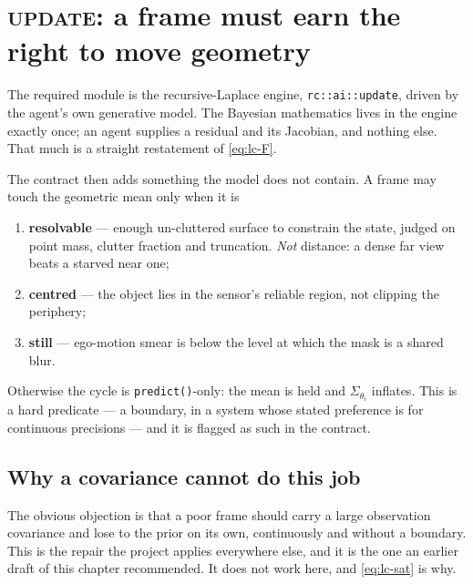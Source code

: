 \documentclass[11pt,a4paper]{report}
\newcommand{\stage}[1]{\textsc{#1}}
\newcommand{\Update}{\stage{update}}
\begin{document}
\section{\Update: a frame must earn the right to move geometry}
\label{sec:update}

The required module is the recursive-Laplace engine, \texttt{rc::ai::update}, driven by the agent's
own generative model. The Bayesian mathematics lives in the engine exactly once; an agent supplies a
residual and its Jacobian, and nothing else. That much is a straight restatement of
\eqref{eq:lc-F}.

The contract then adds something the model does not contain. A frame may touch the geometric mean
only when it is

\begin{enumerate}[label=\arabic*.,leftmargin=1.9em,itemsep=3pt]
\item \textbf{resolvable} --- enough un-cluttered surface to constrain the state, judged on point
      mass, clutter fraction and truncation. \emph{Not} distance: a dense far view beats a starved
      near one;
\item \textbf{centred} --- the object lies in the sensor's reliable region, not clipping the
      periphery;
\item \textbf{still} --- ego-motion smear is below the level at which the mask is a shared blur.
\end{enumerate}

\noindent
Otherwise the cycle is \texttt{predict()}-only: the mean is held and $\Sigma_{\theta_i}$ inflates.
This is a hard predicate --- a boundary, in a system whose stated preference is for continuous
precisions --- and it is flagged as such in the contract.

\subsection{Why a covariance cannot do this job}
\label{sec:whygate}

The obvious objection is that a poor frame should carry a large observation covariance and lose to
the prior on its own, continuously and without a boundary. This is the repair the project applies
everywhere else, and it is the one an earlier draft of this chapter recommended. It does not work
here, and \eqref{eq:lc-sat} is why.
\end{document}
